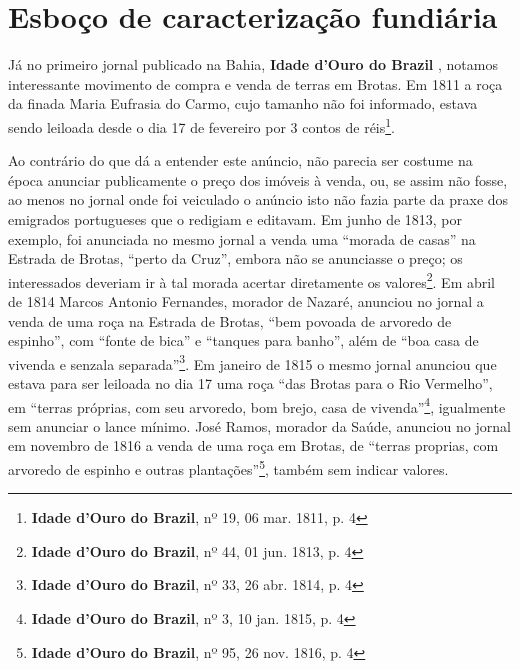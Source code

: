 \section{Esboço de caracterização fundiária}\label{sec:2.3}

Já no primeiro jornal publicado na Bahia, \textbf{Idade d'Ouro do Brazil} \cite[p.~162]{souza_imprensa_1972}, notamos interessante movimento de compra e venda de terras em Brotas. Em 1811 a roça da finada Maria Eufrasia do Carmo, cujo tamanho não foi informado, estava sendo leiloada desde o dia 17 de fevereiro por 3 contos de réis\footnote{\textbf{Idade d'Ouro do Brazil}, nº 19, 06 mar. 1811, p. 4}. 

Ao contrário do que dá a entender este anúncio, não parecia ser costume na época anunciar publicamente o preço dos imóveis à venda, ou, se assim não fosse, ao menos no jornal onde foi veiculado o anúncio isto não fazia parte da praxe dos emigrados portugueses que o redigiam e editavam. Em junho de 1813, por exemplo, foi anunciada no mesmo jornal a venda uma ``morada de casas'' na Estrada de Brotas, ``perto da Cruz'', embora não se anunciasse o preço; os interessados deveriam ir à tal morada acertar diretamente os valores\footnote{\textbf{Idade d'Ouro do Brazil}, nº 44, 01 jun. 1813, p. 4}. Em abril de 1814 Marcos Antonio Fernandes, morador de Nazaré, anunciou no jornal a venda de uma roça na Estrada de Brotas, ``bem povoada de arvoredo de espinho'', com ``fonte de bica'' e ``tanques para banho'', além de ``boa casa de vivenda e senzala separada''\footnote{\textbf{Idade d'Ouro do Brazil}, nº 33, 26 abr. 1814, p. 4}. Em janeiro de 1815 o mesmo jornal anunciou que estava para ser leiloada no dia 17 uma roça ``das Brotas para o Rio Vermelho'', em ``terras próprias, com seu arvoredo, bom brejo, casa de vivenda''\footnote{\textbf{Idade d'Ouro do Brazil}, nº 3, 10 jan. 1815, p. 4}, igualmente sem anunciar o lance mínimo. José Ramos, morador da Saúde, anunciou no jornal em novembro de 1816 a venda de uma roça em Brotas, de ``terras proprias, com arvoredo de espinho e outras plantações''\footnote{\textbf{Idade d'Ouro do Brazil}, nº 95, 26 nov. 1816, p. 4}, também sem indicar valores. 

